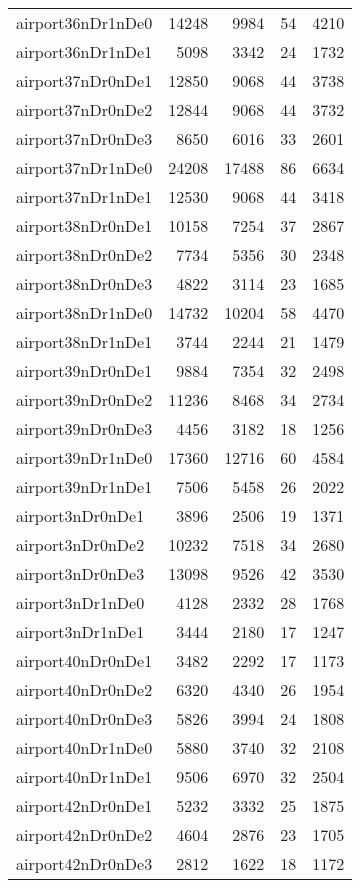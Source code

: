 \begin{tabular}{lrrrr}
airport36nDr1nDe0 & 14248 & 9984 & 54 & 4210 \\
airport36nDr1nDe1 & 5098 & 3342 & 24 & 1732 \\
airport37nDr0nDe1 & 12850 & 9068 & 44 & 3738 \\
airport37nDr0nDe2 & 12844 & 9068 & 44 & 3732 \\
airport37nDr0nDe3 & 8650 & 6016 & 33 & 2601 \\
airport37nDr1nDe0 & 24208 & 17488 & 86 & 6634 \\
airport37nDr1nDe1 & 12530 & 9068 & 44 & 3418 \\
airport38nDr0nDe1 & 10158 & 7254 & 37 & 2867 \\
airport38nDr0nDe2 & 7734 & 5356 & 30 & 2348 \\
airport38nDr0nDe3 & 4822 & 3114 & 23 & 1685 \\
airport38nDr1nDe0 & 14732 & 10204 & 58 & 4470 \\
airport38nDr1nDe1 & 3744 & 2244 & 21 & 1479 \\
airport39nDr0nDe1 & 9884 & 7354 & 32 & 2498 \\
airport39nDr0nDe2 & 11236 & 8468 & 34 & 2734 \\
airport39nDr0nDe3 & 4456 & 3182 & 18 & 1256 \\
airport39nDr1nDe0 & 17360 & 12716 & 60 & 4584 \\
airport39nDr1nDe1 & 7506 & 5458 & 26 & 2022 \\
airport3nDr0nDe1 & 3896 & 2506 & 19 & 1371 \\
airport3nDr0nDe2 & 10232 & 7518 & 34 & 2680 \\
airport3nDr0nDe3 & 13098 & 9526 & 42 & 3530 \\
airport3nDr1nDe0 & 4128 & 2332 & 28 & 1768 \\
airport3nDr1nDe1 & 3444 & 2180 & 17 & 1247 \\
airport40nDr0nDe1 & 3482 & 2292 & 17 & 1173 \\
airport40nDr0nDe2 & 6320 & 4340 & 26 & 1954 \\
airport40nDr0nDe3 & 5826 & 3994 & 24 & 1808 \\
airport40nDr1nDe0 & 5880 & 3740 & 32 & 2108 \\
airport40nDr1nDe1 & 9506 & 6970 & 32 & 2504 \\
airport42nDr0nDe1 & 5232 & 3332 & 25 & 1875 \\
airport42nDr0nDe2 & 4604 & 2876 & 23 & 1705 \\
airport42nDr0nDe3 & 2812 & 1622 & 18 & 1172 \\

\end{tabular}
